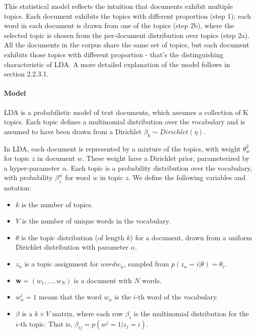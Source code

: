 \documentclass[12pt]{report}
\begin{document}
This statistical model reflects the intuition that documents exhibit multiple
topics. Each document exhibits the topics with different proportion (step 1);
each word in each document is drawn from one of the topics (step 2b), where the
selected topic is chosen from the per-document distribution over topics (step
2a). All the documents in the corpus share the same set of topics, but each
document exhibits those topics with different proportion - that’s the
distinguishing characteristic of LDA. A more detailed explanation of the model
follows in section 2.2.3.1.

\paragraph{Model}

LDA is a probabilistic model of text documents, which assumes a collection of 
K topics. Each topic defines a multinomial distribution over the vocabulary 
and is assumed to have been drawn from a Dirichlet 
$\beta_k \sim Dirichlet(\eta)$.

In LDA, each document is represented by a mixture of the topics, with weight
$\theta_w^2$ for topic $z$ in document $w$. These weight have a Dirichlet prior,
parameterized by a hyper-parameter $\alpha$. Each topic is a probability
distribution over the vocabulary, with probability $\beta^w_z$ for word $w$ in
topic $z$. We define the following variables and notation:
\begin{itemize}
  \item[] $k$ is the number of topics.
  \item[] $V$ is the number of unique words in the vocabulary.
  \item[] $\theta$  is the topic distribution (of length $k$) for a document,
   drawn from a uniform Dirichlet distribution with parameter $\alpha$.
  \item[] $z_{n}$ is a topic assignment for $word w_{n}$, sampled from 
  $p(z_{n} = i|\theta) = \theta_{i}$.
  \item[] \textbf{w}$ = (w_{1}, ... , w_{N})$ is a document with $N$ words.
  \item[] $w_{n}^{i} = 1$ means that the word $w_{n}$ is the $i$-th word 
  of the vocabulary.
  \item[] $\beta$  is a $k \times V$ matrix, where each row $\beta_{i}$ 
  is the multinomial distribution for the $i$-th topic. That is, 
  $\beta_{ij} = p(w^{j} = 1 | z_{j} = i)$.
\end{itemize}
\end{document}
